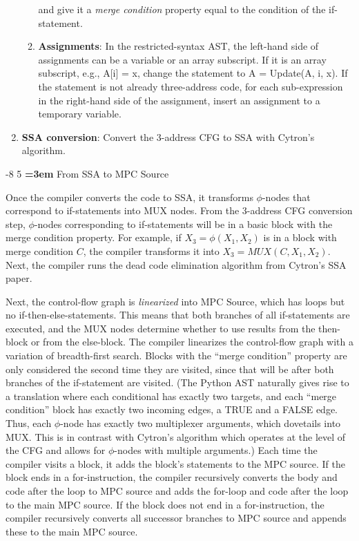 \documentclass[sigconf, screen, natbib=false, dvipsnames, table]{acmart}
\makeatletter
\renewcommand{\subsection}{\@startsection{subsection}{2}{\z@}%
                        {-8\p@ \@plus -4\p@ \@minus -4\p@}%
                        {5\p@ \@plus 2\p@ \@minus 2\p@}%
                        {\normalfont\Large\bfseries\boldmath
                         \rightskip=\z@ \@plus 3em\pretolerance=10000 }}
\theoremstyle{definition}
\makeatother
\begin{document}
\begin{enumerate}
\begin{enumerate}
                and give it a \emph{merge condition} property equal to the condition of the if-statement.
          \item
                \textbf{Assignments}:
                In the restricted-syntax AST,
                the left-hand side of assignments
                can be a variable or an array subscript.
                If it is an array subscript, e.g., {\sf A[i] = x},
                change the statement to {\sf A = Update(A, i, x)}.
                If the statement is not already three-address code,
                for each sub-expression in the right-hand side of the assignment,
                insert an assignment to a temporary variable.
        \end{enumerate}
  \item
        \textbf{SSA conversion}:
        Convert the 3-address CFG to SSA with Cytron's algorithm.
\end{enumerate}

\subsection{From SSA to MPC Source} %

Once the compiler converts the code to SSA,
it transforms $\phi$-nodes that correspond to if-statements into MUX nodes.
From the 3-address CFG conversion step,
$\phi$-nodes corresponding to if-statements will be in a basic block
with the merge condition property.
For example, if $X_3 = \phi(X_1,X_2)$ is in a block with merge condition $C$,
the compiler transforms it into $X_3 = \mathit{MUX}(C, X_1, X_2)$.
Next, the compiler runs the dead code elimination algorithm from Cytron's SSA paper.

Next, the control-flow graph is \emph{linearized} into MPC Source,
which has loops but no if-then-else-statements.
This means that both branches of all if-statements are executed,
and the MUX nodes determine whether to use results from the then-block or from the else-block.
The compiler linearizes the control-flow graph with a variation of breadth-first search.
Blocks with the ``merge condition'' property are only considered
the second time they are visited,
since that will be after both branches of the if-statement are visited. 
(The Python AST naturally gives rise to a translation where each conditional has exactly two targets, 
and each ``merge condition'' block has exactly two incoming edges, a TRUE and a FALSE edge.
Thus, each $\phi$-node has exactly two multiplexer arguments, which dovetails into MUX.
This is in contrast with Cytron's algorithm which operates at the level of the CFG and allows for 
$\phi$-nodes with multiple arguments.)
Each time the compiler visits a block,
it adds the block's statements to the MPC source.
If the block ends in a for-instruction,
the compiler recursively converts the body and code after the loop to MPC source
and adds the for-loop and code after the loop to the main MPC source.
If the block does not end in a for-instruction,
the compiler recursively converts all successor branches to MPC source and
appends these to the main MPC source.
\end{document}
